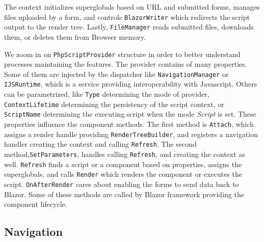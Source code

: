 The context initializes superglobals based on URL and submitted forms, manages files uploaded by a form, and controls  \texttt{BlazorWriter} which redirects the script output to the render tree.
Lastly, \texttt{FileManager} reads submitted files, downloads them, or deletes them from Browser memory.
\par
We zoom in on \texttt{PhpScriptProvider} structure in order to better understand processes maintaining the features.
The provider contains of many properties.
Some of them are injected by the dispatcher like \texttt{NavigationManager} or \texttt{IJSRuntime}, which is a service providing interoperability with Javascript.
Others can be parametrized, like \texttt{Type} determining the mode of provider, \texttt{ContextLifetime} determining the persistency of the script context, or \texttt{ScriptName} determining the executing script when the mode \textit{Script} is set.
These properties influence the component methods.
The first method is \texttt{Attach}, which assigns a render handle providing \texttt{RenderTreeBuilder}, and registers a navigation handler creating the context and calling \texttt{Refresh}.
The second method,\texttt{SetParameters}, handles calling \texttt{Refresh}, and creating the context as well.
\texttt{Refresh} finds a script or a component based on properties, assigns the superglobals, and calls \texttt{Render} which renders the component or executes the script.
\texttt{OnAfterRender} cares about enabling the forms to send data back to Blazor.
Some of these methods are called by Blazor framework providing the component lifecycle.

\subsection{Navigation}

